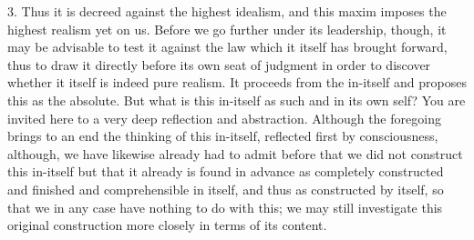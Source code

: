 3. Thus it is decreed against the highest idealism,
and this maxim imposes the highest realism yet on us.
Before we go further under its leadership, though,
it may be advisable to test it against the law
which it itself has brought forward,
thus to draw it directly before its own seat of judgment
in order to discover whether it itself is indeed pure realism.
It proceeds from the in-itself
and proposes this as the absolute.
But what is this in-itself as such
and in its own self?
You are invited here to
a very deep reflection and abstraction.
Although the foregoing brings to an end
the thinking of this in-itself,
reflected first by consciousness,
although, we have likewise already had to
admit before that we did not construct this in-itself
but that it already is found in advance
as completely constructed and finished
and comprehensible in itself,
and thus as constructed by itself,
so that we in any case have nothing to do with this;
we may still investigate this original construction
more closely in terms of its content.

